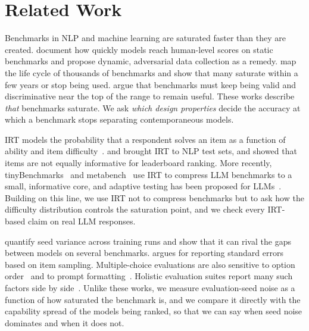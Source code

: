 \section{Related Work}
\label{sec:related}

Benchmarks in NLP and machine learning are saturated faster than they are created. \citet{kiela2021dynabench} document how quickly models reach human-level scores on static benchmarks and propose dynamic, adversarial data collection as a remedy. \citet{ott2022mapping} map the life cycle of thousands of benchmarks and show that many saturate within a few years or stop being used. \citet{bowman2021will} argue that benchmarks must keep being valid and discriminative near the top of the range to remain useful. These works describe {\em that} benchmarks saturate. We ask {\em which design properties} decide the accuracy at which a benchmark stops separating contemporaneous models.

IRT models the probability that a respondent solves an item as a function of ability and item difficulty~\citep{rasch1960probabilistic,lord1980applications}. \citet{lalor2016building} and \citet{vania2021comparing} brought IRT to NLP test sets, and \citet{rodriguez2021evaluation} showed that items are not equally informative for leaderboard ranking. More recently, tinyBenchmarks~\citep{polo2024tinybenchmarks} and metabench~\citep{kipnis2024metabench} use IRT to compress LLM benchmarks to a small, informative core, and adaptive testing has been proposed for LLMs~\citep{zhuang2023efficiently}. Building on this line, we use IRT not to compress benchmarks but to ask how the difficulty distribution controls the saturation point, and we check every IRT-based claim on real LLM responses.

\citet{madaan2024quantifying} quantify seed variance across training runs and show that it can rival the gaps between models on several benchmarks. \citet{miller2024adding} argues for reporting standard errors based on item sampling. Multiple-choice evaluations are also sensitive to option order~\citep{zheng2024large,pezeshkpour2024large} and to prompt formatting~\citep{sclar2024quantifying}. Holistic evaluation suites report many such factors side by side~\citep{liang2023holistic}. Unlike these works, we measure evaluation-seed noise as a function of how saturated the benchmark is, and we compare it directly with the capability spread of the models being ranked, so that we can say when seed noise dominates and when it does not.
